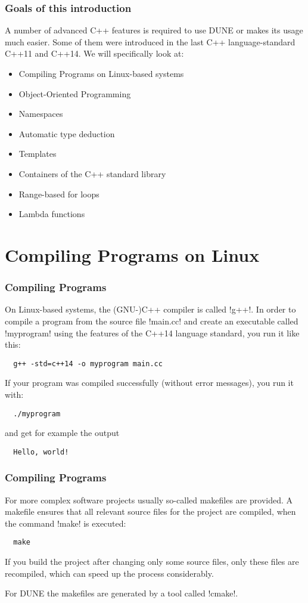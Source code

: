 \begin{frame}
  \frametitle{Goals of this introduction}
  A number of advanced C++ features is required to use DUNE or makes
  its usage much easier. Some of them were introduced in the last
  C++ language-standard  C++11 and C++14. We will specifically look at:
  \begin{itemize}
  \item Compiling Programs on Linux-based systems
  \item Object-Oriented Programming
  \item Namespaces
  \item Automatic type deduction
  \item Templates
  \item Containers of the C++ standard library
  \item Range-based for loops
  \item Lambda functions
  \end{itemize}
\end{frame}

\section{Compiling Programs on Linux}
\begin{frame}[fragile]
  \frametitle<presentation>{Compiling Programs}
  On Linux-based systems, the (GNU-)C++ compiler is called \inline!g++!. In order to compile a program from the source file \inline!main.cc! and create an executable called \inline!myprogram! using the features of the C++14 language standard, you run it like this:
  \begin{lstlisting}
  g++ -std=c++14 -o myprogram main.cc
  \end{lstlisting}
If your program was compiled successfully (without error messages), you run it with:
  \begin{lstlisting}
  ./myprogram
  \end{lstlisting}
and get for example the output
  \begin{lstlisting}
  Hello, world!
  \end{lstlisting}
\end{frame}

\begin{frame}[fragile]
  \frametitle<presentation>{Compiling Programs}
  For more complex software projects usually so-called makefiles are provided. A makefile ensures that all relevant source files for the project are compiled, when the command \inline!make! is executed:
  \begin{lstlisting}
  make
  \end{lstlisting}
  If you build the project after changing only some source files, only these files are recompiled, which can speed up the process considerably.
  
  For DUNE the makefiles are generated by a tool called \inline!cmake!.
\end{frame}

